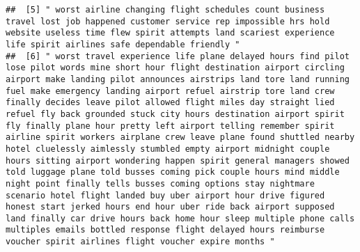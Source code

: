 \documentclass[
]{article}
\begin{document}
\begin{verbatim}
##  [5] " worst airline changing flight schedules count business travel lost job happened customer service rep impossible hrs hold website useless time flew spirit attempts land scariest experience life spirit airlines safe dependable friendly "                                                                                                                                                                                                                                                                                                                                                                                                                                                                                                                                                                                                                                                                                                                                                                                                                                                                                                                              
##  [6] " worst travel experience life plane delayed hours find pilot lose pilot words mine short hour flight destination airport circling airport make landing pilot announces airstrips land tore land running fuel make emergency landing airport refuel airstrip tore land crew finally decides leave pilot allowed flight miles day straight lied refuel fly back grounded stuck city hours destination airport spirit fly finally plane hour pretty left airport telling remember spirit airline spirit workers airplane crew leave plane found shuttled nearby hotel cluelessly aimlessly stumbled empty airport midnight couple hours sitting airport wondering happen spirit general managers showed told luggage plane told busses coming pick couple hours mind middle night point finally tells busses coming options stay nightmare scenario hotel flight landed buy uber airport hour drive figured honest start jerked hours end hour uber ride back airport supposed land finally car drive hours back home hour sleep multiple phone calls multiples emails bottled response flight delayed hours reimburse voucher spirit airlines flight voucher expire months "

\end{verbatim}
\end{document}

